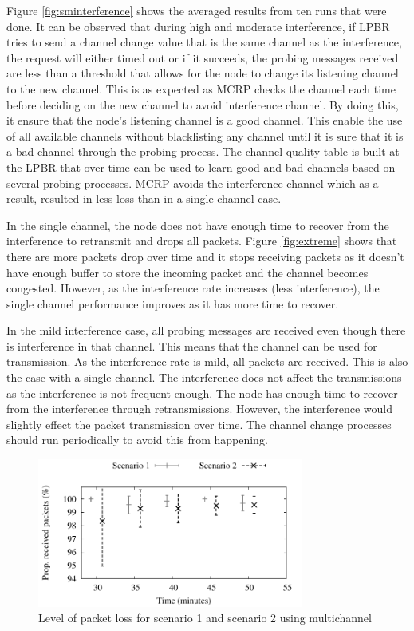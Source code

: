 Figure \ref{fig:sminterference} shows the averaged results from ten runs that were done. It can be observed that during high and moderate interference, if LPBR tries to send a channel change value that is the same channel as the interference, the request will either timed out or if it succeeds, the probing messages received are less than a threshold that allows for the node to change its listening channel to the new channel. This is as expected as MCRP checks the channel each time before deciding on the new channel to avoid interference channel. By doing this, it ensure that the node's listening channel is a good channel. This enable the use of all available channels without blacklisting any channel until it is sure that it is a bad channel through the probing process. The channel quality table is built at the LPBR that over time can be used to learn good and bad channels based on several probing processes. MCRP avoids the interference channel which as a result, resulted in less loss than in a single channel case. 

In the single channel, the node does not have enough time to recover from the interference to retransmit and drops all packets. Figure \ref{fig:extreme} shows that there are more packets drop over time and it stops receiving packets as it doesn't have enough buffer to store the incoming packet and the channel becomes congested. However, as the interference rate increases (less interference), the single channel performance improves as it has more time to recover.

In the mild interference case, all probing messages are received even though there is interference in that channel. This means that the channel can be used for transmission. As the interference rate is mild, all packets are received. This is also the case with a single channel. The interference does not affect the transmissions as the interference is not frequent enough. The node has enough time to recover from the interference through retransmissions. However, the interference would slightly effect the packet transmission over time. The channel change processes should run periodically to avoid this from happening.

\begin{figure}
\centering
\includegraphics[width=0.78\textwidth]{multi_channel.pdf}
\caption{Level of packet loss for scenario 1 and scenario 2 using multichannel}
\label{fig:multi_interference}
\end{figure}


